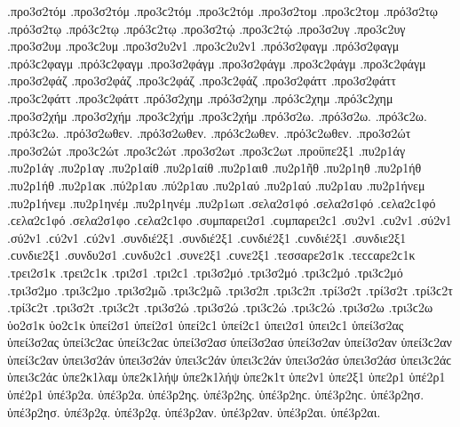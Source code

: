 {.προ3σ2τόμ .προ3σ2τόμ .προ3ϲ2τόμ .προ3ϲ2τόμ   %
.προ3σ2τομ .προ3ϲ2τομ
.πρό3σ2τῳ .πρό3σ2τῳ .πρό3ϲ2τῳ .πρό3ϲ2τῳ   %
.προ3σ2τῴ .προ3ϲ2τῴ
.προ3σ2υγ .προ3ϲ2υγ   %
.προ3σ2υμ .προ3ϲ2υμ   %
.προ3σ2υ2ν1 .προ3ϲ2υ2ν1   %
.πρό3σ2φαγμ .πρό3σ2φαγμ .πρό3ϲ2φαγμ .πρό3ϲ2φαγμ   %
.προ3σ2φάγμ .προ3σ2φάγμ .προ3ϲ2φάγμ .προ3ϲ2φάγμ
.προ3σ2φάζ .προ3σ2φάζ .προ3ϲ2φάζ .προ3ϲ2φάζ   %
.προ3σ2φάττ .προ3σ2φάττ .προ3ϲ2φάττ .προ3ϲ2φάττ   %
.πρό3σ2χημ .πρό3σ2χημ .πρό3ϲ2χημ .πρό3ϲ2χημ   %
.προ3σ2χήμ .προ3σ2χήμ .προ3ϲ2χήμ .προ3ϲ2χήμ
.πρό3σ2ω. .πρό3σ2ω. .πρό3ϲ2ω. .πρό3ϲ2ω.
.πρό3σ2ωθεν. .πρό3σ2ωθεν. .πρό3ϲ2ωθεν. .πρό3ϲ2ωθεν.
.προ3σ2ώτ .προ3σ2ώτ .προ3ϲ2ώτ .προ3ϲ2ώτ   %
.προ3σ2ωτ .προ3ϲ2ωτ
.προϋπε2ξ1   %
.πυ2ρ1άγ .πυ2ρ1άγ   %
.πυ2ρ1αγ
.πυ2ρ1αίθ .πυ2ρ1αίθ   %
.πυ2ρ1αιθ   %
.πυ2ρ1ῆθ   %
.πυ2ρ1ηθ   %
.πυ2ρ1ήθ .πυ2ρ1ήθ   %
.πυ2ρ1ακ   %
.πύ2ρ1αυ .πύ2ρ1αυ   %
.πυ2ρ1αύ .πυ2ρ1αύ
.πυ2ρ1αυ   %
.πυ2ρ1ήνεμ .πυ2ρ1ήνεμ   %
.πυ2ρ1ηνέμ .πυ2ρ1ηνέμ
.πυ2ρ1ωπ   %
.σελα2σ1φό .σελα2σ1φό .ϲελα2ϲ1φό .ϲελα2ϲ1φό   %
.σελα2σ1φο .ϲελα2ϲ1φο
.συμπαρει2σ1 .ϲυμπαρει2ϲ1   %
.συ2ν1 .ϲυ2ν1
.σύ2ν1 .σύ2ν1 .ϲύ2ν1 .ϲύ2ν1   %
.συνδιέ2ξ1 .συνδιέ2ξ1 .ϲυνδιέ2ξ1 .ϲυνδιέ2ξ1   %
.συνδιε2ξ1 .ϲυνδιε2ξ1   %
.συνδυ2σ1 .ϲυνδυ2ϲ1   %
.συνε2ξ1 .ϲυνε2ξ1   %
.τεσσαρε2σ1κ .τεϲϲαρε2ϲ1κ   %
.τρει2σ1κ .τρει2ϲ1κ   %
.τρι2σ1 .τρι2ϲ1
.τρι3σ2μό .τρι3σ2μό .τρι3ϲ2μό .τρι3ϲ2μό   %
.τρι3σ2μο .τρι3ϲ2μο
.τρι3σ2μῶ .τρι3ϲ2μῶ
.τρι3σ2π .τρι3ϲ2π   %
.τρί3σ2τ .τρί3σ2τ .τρί3ϲ2τ .τρί3ϲ2τ   %
.τρι3σ2τ .τρι3ϲ2τ
.τρι3σ2ώ .τρι3σ2ώ .τρι3ϲ2ώ .τρι3ϲ2ώ   %
.τρι3σ2ω .τρι3ϲ2ω
ὑο2σ1κ ὑο2ϲ1κ   %
ὑπεί2σ1 ὑπεί2σ1 ὑπεί2ϲ1 ὑπεί2ϲ1
ὑπει2σ1 ὑπει2ϲ1
ὑπεί3σ2ας ὑπεί3σ2ας ὑπεί3ϲ2αϲ ὑπεί3ϲ2αϲ   %
ὑπεί3σ2ασ ὑπεί3σ2ασ
ὑπεί3σ2αν ὑπεί3σ2αν ὑπεί3ϲ2αν ὑπεί3ϲ2αν
ὑπει3σ2άν ὑπει3σ2άν ὑπει3ϲ2άν ὑπει3ϲ2άν
ὑπει3σ2άσ ὑπει3σ2άσ ὑπει3ϲ2άϲ ὑπει3ϲ2άϲ
ὑπε2κ1λαμ   %
ὑπε2κ1λήψ ὑπε2κ1λήψ   %
ὑπε2κ1τ   %
ὑπε2ν1
ὑπε2ξ1
ὑπε2ρ1
ὑπέ2ρ1 ὑπέ2ρ1
ὑπέ3ρ2α. ὑπέ3ρ2α.   %
ὑπέ3ρ2ης. ὑπέ3ρ2ης. ὑπέ3ρ2ηϲ. ὑπέ3ρ2ηϲ.
ὑπέ3ρ2ησ. ὑπέ3ρ2ησ.
ὑπέ3ρ2ᾳ. ὑπέ3ρ2ᾳ.
ὑπέ3ρ2αν. ὑπέ3ρ2αν.
ὑπέ3ρ2αι. ὑπέ3ρ2αι.
}

